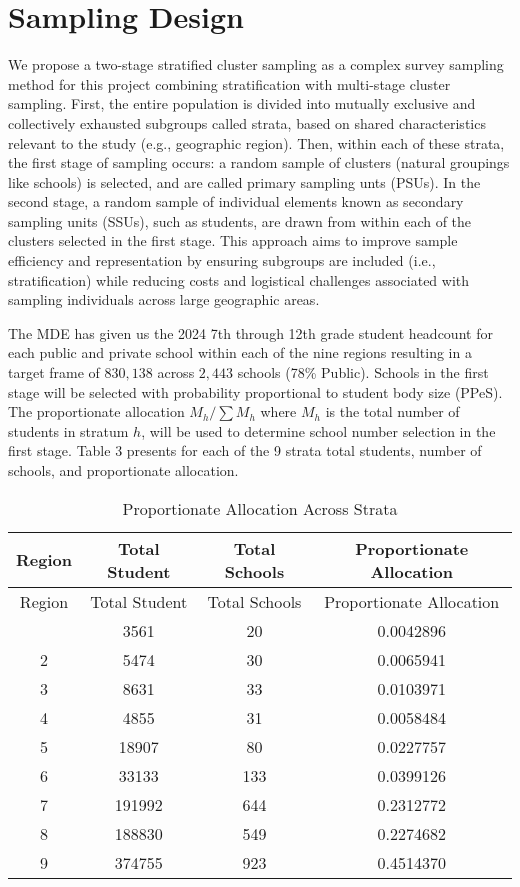 \documentclass[
  12pt]{article}
\begin{document}
\section{Sampling Design}\label{sec-meth}

We propose a two-stage stratified cluster sampling as a complex survey
sampling method for this project combining stratification with
multi-stage cluster sampling. First, the entire population is divided
into mutually exclusive and collectively exhausted subgroups called
strata, based on shared characteristics relevant to the study (e.g.,
geographic region). Then, within each of these strata, the first stage
of sampling occurs: a random sample of clusters (natural groupings like
schools) is selected, and are called primary sampling unts (PSUs). In
the second stage, a random sample of individual elements known as
secondary sampling units (SSUs), such as students, are drawn from within
each of the clusters selected in the first stage. This approach aims to
improve sample efficiency and representation by ensuring subgroups are
included (i.e., stratification) while reducing costs and logistical
challenges associated with sampling individuals across large geographic
areas.

The MDE has given us the 2024 7th through 12th grade student headcount
for each public and private school within each of the nine regions
resulting in a target frame of \(830,138\) across \(2,443\) schools
(78\% Public). Schools in the first stage will be selected with
probability proportional to student body size (PPeS). The proportionate
allocation \(M_h / \sum M_h\) where \(M_h\) is the total number of
students in stratum \(h\), will be used to determine school number
selection in the first stage. Table 3 presents for each of the 9 strata
total students, number of schools, and proportionate allocation.

\begin{longtable}[]{@{}cccc@{}}
\caption{Proportionate Allocation Across Strata}\tabularnewline
\toprule\noalign{}
Region & Total Student & Total Schools & Proportionate Allocation \\
\midrule\noalign{}
\endfirsthead
\toprule\noalign{}
Region & Total Student & Total Schools & Proportionate Allocation \\
\midrule\noalign{}
\endhead
\bottomrule\noalign{}
\endlastfoot
1 & 3561 & 20 & 0.0042896 \\
2 & 5474 & 30 & 0.0065941 \\
3 & 8631 & 33 & 0.0103971 \\
4 & 4855 & 31 & 0.0058484 \\
5 & 18907 & 80 & 0.0227757 \\
6 & 33133 & 133 & 0.0399126 \\
7 & 191992 & 644 & 0.2312772 \\
8 & 188830 & 549 & 0.2274682 \\
9 & 374755 & 923 & 0.4514370 \\
\end{longtable}
\end{document}
